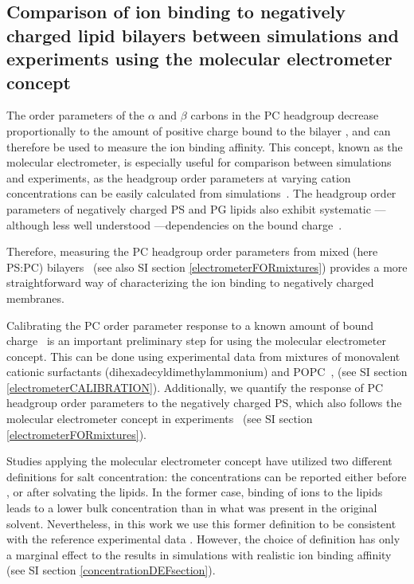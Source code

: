 \documentclass[aps,prl,superscriptaddress,twocolumn]{revtex4}
\begin{document}
\subsection{Comparison of ion binding to negatively charged lipid bilayers 
between simulations and experiments using the molecular electrometer concept}

The order parameters of the $\alpha$ and $\beta$ carbons in the PC headgroup
decrease proportionally to the amount of positive
charge bound to the bilayer \cite{akutsu81,altenbach84,seelig87},
and can therefore be used to measure the ion binding affinity.
This concept, known as the molecular electrometer, is especially useful for 
comparison between simulations and experiments, as
the headgroup order parameters at varying cation
concentrations can be easily calculated from
simulations~\cite{catte16}. The headgroup order parameters
of negatively charged PS and PG lipids also exhibit systematic --- although less well understood ---dependencies on the bound charge~\cite{borle85,macdonald87,roux86,roux90}.

Therefore, measuring the PC headgroup order parameters from 
mixed (here PS:PC) bilayers~\cite{roux86,roux90,roux91} (see also SI section \ref{electrometerFORmixtures}) provides a more straightforward way of characterizing the ion binding to negatively charged membranes.

Calibrating the PC order parameter response to a known amount of bound charge~\cite{catte16,melcr18} is an important preliminary step for using the molecular electrometer concept.
This can be done using experimental data from mixtures of
monovalent cationic surfactants (dihexadecyldimethylammonium) and POPC~\cite{scherer89,melcr18},
(see SI section \ref{electrometerCALIBRATION}). Additionally, we quantify the response of PC headgroup order parameters
to the negatively charged PS, which also follows the molecular electrometer
concept in experiments~\cite{scherer87} (see SI section \ref{electrometerFORmixtures}).

Studies applying the molecular electrometer concept have utilized two different definitions for salt concentration:
the concentrations can be reported either before \cite{akutsu81,roux90,catte16}, or after \cite{altenbach84,melcr18} solvating the lipids. In the former case, binding of ions to the lipids leads to a lower bulk concentration than in what was present in the original solvent.
Nevertheless, in this work we use this former definition to be consistent with the reference
experimental data \cite{roux90}. However, the choice of definition has only a marginal effect
to the results in simulations with realistic ion binding affinity
(see SI section \ref{concentrationDEFsection}).
\end{document}
